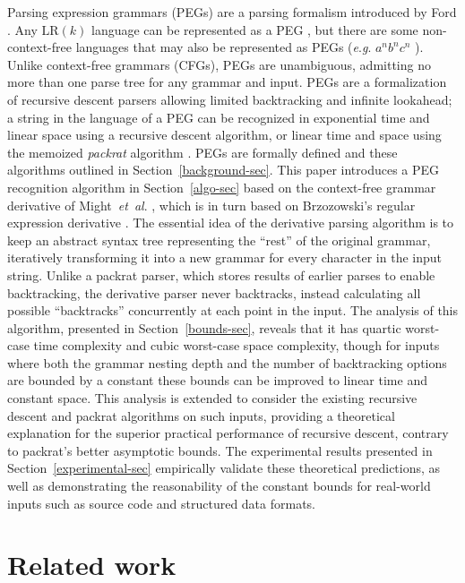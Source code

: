 \documentclass[submission,copyright,creativecommons]{eptcs}
\newcommand{\eg}{\textit{e}.\textit{g}.}
\newcommand{\etal}{\textit{et~al}. }
\begin{document}
Parsing expression grammars (PEGs) are a parsing formalism introduced by Ford \cite{For02}. 
Any $\mathrm{LR}(k)$ language can be represented as a PEG \cite{For04}, but there are some non-context-free languages that may also be represented as PEGs (\eg{} $a^n b^n c^n$ \cite{For04}). 
Unlike context-free grammars (CFGs), PEGs are unambiguous, admitting no more than one parse tree for any grammar and input. 
PEGs are a formalization of recursive descent parsers allowing limited backtracking and infinite lookahead; a string in the language of a PEG can be recognized in exponential time and linear space using a recursive descent algorithm, or linear time and space using the memoized \emph{packrat} algorithm \cite{For02}. 
PEGs are formally defined and these algorithms outlined in Section~\ref{background-sec}. 
This paper introduces a PEG recognition algorithm in Section~\ref{algo-sec} based on the context-free grammar derivative of Might~\etal  \cite{MDS11}, which is in turn based on Brzozowski's regular expression derivative \cite{Brz64}. 
The essential idea of the derivative parsing algorithm is to keep an abstract syntax tree representing the ``rest'' of the original grammar, iteratively transforming it into a new grammar for every character in the input string. 
Unlike a packrat parser, which stores results of earlier parses to enable backtracking, the derivative parser never backtracks, instead calculating all possible ``backtracks'' concurrently at each point in the input. 
The analysis of this algorithm, presented in Section~\ref{bounds-sec}, reveals that it has quartic worst-case time complexity and cubic worst-case space complexity, though for inputs where both the grammar nesting depth and the number of backtracking options are bounded by a constant these bounds can be improved to linear time and constant space. 
This analysis is extended to consider the existing recursive descent and packrat algorithms on such inputs, providing a theoretical explanation for the superior practical performance of recursive descent, contrary to packrat's better asymptotic bounds.
The experimental results presented in Section~\ref{experimental-sec} empirically validate these theoretical predictions, as well as demonstrating the reasonability of the constant bounds for real-world inputs such as source code and structured data formats.

\section{Related work}
\end{document}
